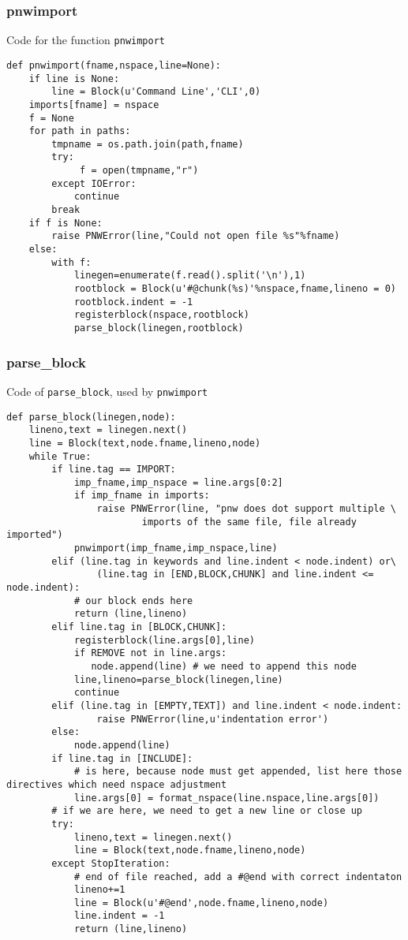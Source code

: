\documentclass[neutral,proc,reqno]{ml-gen}
\begin{document}
\subsubsection{pnwimport}

Code for the function \lstinline!pnwimport!

\begin{lstlisting}
def pnwimport(fname,nspace,line=None):
    if line is None:
        line = Block(u'Command Line','CLI',0)
    imports[fname] = nspace
    f = None
    for path in paths:
        tmpname = os.path.join(path,fname)
        try:
             f = open(tmpname,"r")
        except IOError:
            continue
        break
    if f is None:
        raise PNWError(line,"Could not open file %s"%fname)
    else:
        with f:
            linegen=enumerate(f.read().split('\n'),1)
            rootblock = Block(u'#@chunk(%s)'%nspace,fname,lineno = 0)
            rootblock.indent = -1
            registerblock(nspace,rootblock)
            parse_block(linegen,rootblock)
\end{lstlisting}
\subsubsection{parse\_block}

Code of \lstinline!parse_block!, used by \lstinline!pnwimport!

\begin{lstlisting}
def parse_block(linegen,node): 
    lineno,text = linegen.next()
    line = Block(text,node.fname,lineno,node)
    while True:
        if line.tag == IMPORT:
            imp_fname,imp_nspace = line.args[0:2]
            if imp_fname in imports:
                raise PNWError(line, "pnw does dot support multiple \
                        imports of the same file, file already imported")
            pnwimport(imp_fname,imp_nspace,line)
        elif (line.tag in keywords and line.indent < node.indent) or\
                (line.tag in [END,BLOCK,CHUNK] and line.indent <= node.indent): 
            # our block ends here
            return (line,lineno)
        elif line.tag in [BLOCK,CHUNK]:
            registerblock(line.args[0],line)
            if REMOVE not in line.args:
               node.append(line) # we need to append this node
            line,lineno=parse_block(linegen,line)
            continue
        elif (line.tag in [EMPTY,TEXT]) and line.indent < node.indent:
                raise PNWError(line,u'indentation error')
        else:
            node.append(line)
        if line.tag in [INCLUDE]: 
            # is here, because node must get appended, list here those directives which need nspace adjustment
            line.args[0] = format_nspace(line.nspace,line.args[0])
        # if we are here, we need to get a new line or close up
        try:
            lineno,text = linegen.next()
            line = Block(text,node.fname,lineno,node)
        except StopIteration:
            # end of file reached, add a #@end with correct indentaton
            lineno+=1
            line = Block(u'#@end',node.fname,lineno,node)
            line.indent = -1
            return (line,lineno)
\end{lstlisting}
\end{document}
